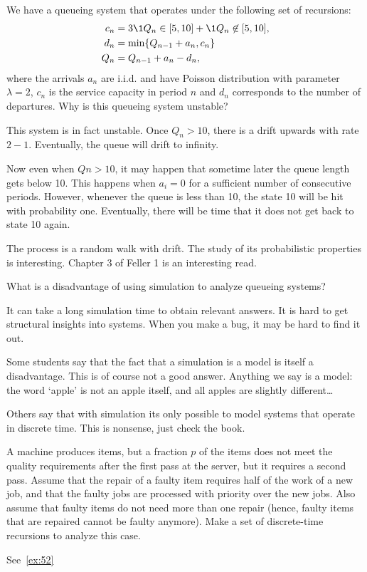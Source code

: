 \begin{exercise}[201807]
We have a queueing system that operates under the following set of recursions:
\begin{align*}
 c_n &= 3\1{Q_n \in [5, 10]} + \1{Q_n \not \in [5, 10]}, \\
d_n &= \min\{Q_{n-1}+a_n, c_n\} \\
Q_n &= Q_{n-1} + a_n - d_n,
\end{align*}
where the arrivals $a_n$ are i.i.d. and have Poisson distribution with parameter $\lambda=2$, $c_n$ is the service capacity in period $n$ and $d_n$ corresponds to the number of departures. Why is this queueing system unstable?
\begin{solution}
This system is in fact unstable. Once $Q_n > 10$, there is a drift upwards with rate $2-1$. Eventually, the queue will drift to infinity. 

Now even when $Qn>10$, it may happen that sometime later the queue length gets below 10. This happens when $a_i = 0$ for a sufficient number of consecutive periods. However, whenever the queue is less than 10, the state 10 will be hit with probability one. Eventually, there will be time that it does not get back to state 10 again. 

The process is a random walk with drift. The study of its probabilistic properties is interesting. Chapter 3 of Feller 1 is an interesting read. 
\end{solution}
\end{exercise}


\begin{exercise}[201807]
 What is a disadvantage of using simulation to analyze queueing systems?
\begin{solution}
 It can take a long simulation time to obtain relevant answers. It is hard to get structural insights into systems. When you make a bug, it may be hard to find it out.

Some students say that the fact that a simulation is a model is itself a disadvantage. This is of course not a good answer. Anything we say is a model: the word `apple' is not an apple itself, and all apples are slightly different\ldots 

Others say that with simulation its only possible to model systems that operate in discrete time. This is nonsense, just check the book. 
\end{solution}
\end{exercise}


\begin{exercise}[201904]
 A machine produces items, but a fraction $p$ of the items does not meet the quality requirements after the first pass at the server, but it requires a second pass.
 Assume that the repair of a faulty item requires half of the work of a new job, and that the faulty jobs are processed with priority over the new jobs.
 Also assume that faulty items do not need more than one repair (hence, faulty items that are repaired cannot be faulty anymore).
 Make a set of discrete-time recursions to analyze this case.
\begin{solution}
See~\cref{ex:52}
\end{solution}
\end{exercise}


